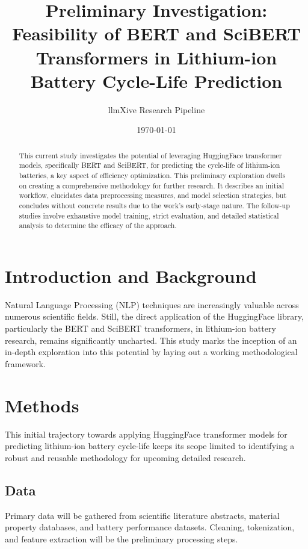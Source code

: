 \documentclass{article}
\title{Preliminary Investigation: Feasibility of BERT and SciBERT Transformers in Lithium-ion Battery Cycle-Life Prediction}
\author{llmXive Research Pipeline}
\date{\today}
\begin{document}
\maketitle

\begin{abstract}
This current study investigates the potential of leveraging HuggingFace transformer models, specifically BERT and SciBERT, for predicting the cycle-life of lithium-ion batteries, a key aspect of efficiency optimization. This preliminary exploration dwells on creating a comprehensive methodology for further research. It describes an initial workflow, elucidates data preprocessing measures, and model selection strategies, but concludes without concrete results due to the work's early-stage nature. The follow-up studies involve exhaustive model training, strict evaluation, and detailed statistical analysis to determine the efficacy of the approach.
\end{abstract}

\section{Introduction and Background}

Natural Language Processing (NLP) techniques are increasingly valuable across numerous scientific fields. Still, the direct application of the HuggingFace library, particularly the BERT and SciBERT transformers, in lithium-ion battery research, remains significantly uncharted. This study marks the inception of an in-depth exploration into this potential by laying out a working methodological framework.

\section{Methods}

This initial trajectory towards applying HuggingFace transformer models for predicting lithium-ion battery cycle-life keeps its scope limited to identifying a robust and reusable methodology for upcoming detailed research.

\subsection{Data}
Primary data will be gathered from scientific literature abstracts, material property databases, and battery performance datasets. Cleaning, tokenization, and feature extraction will be the preliminary processing steps.
\end{document}
